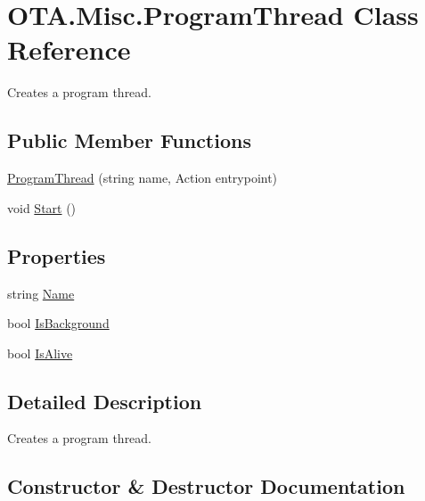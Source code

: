 \hypertarget{class_o_t_a_1_1_misc_1_1_program_thread}{}\section{O\+T\+A.\+Misc.\+Program\+Thread Class Reference}
\label{class_o_t_a_1_1_misc_1_1_program_thread}


Creates a program thread.  


\subsection*{Public Member Functions}
\begin{DoxyCompactItemize}
\item 
\hyperlink{class_o_t_a_1_1_misc_1_1_program_thread_a46eb0601f2287643a45d2a1abf35876f}{Program\+Thread} (string name, Action entrypoint)
\item 
void \hyperlink{class_o_t_a_1_1_misc_1_1_program_thread_a5f8f879fea996242225ff81b0e556762}{Start} ()
\end{DoxyCompactItemize}
\subsection*{Properties}
\begin{DoxyCompactItemize}
\item 
string \hyperlink{class_o_t_a_1_1_misc_1_1_program_thread_aa390df72831267a88ae1ffdda3c18233}{Name}
\item 
bool \hyperlink{class_o_t_a_1_1_misc_1_1_program_thread_a13d9f1585ce295d69974132485e3deeb}{Is\+Background}
\item 
bool \hyperlink{class_o_t_a_1_1_misc_1_1_program_thread_ab9dffe201830586d6a75df5dfa75cd52}{Is\+Alive}
\end{DoxyCompactItemize}


\subsection{Detailed Description}
Creates a program thread. 



\subsection{Constructor \& Destructor Documentation}
\hypertarget{class_o_t_a_1_1_misc_1_1_program_thread_a46eb0601f2287643a45d2a1abf35876f}{}

